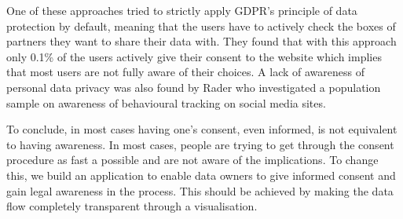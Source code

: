 \documentclass[../paper.tex]{subfiles}
\begin{document}
  One of these approaches tried to strictly apply GDPR's principle of data protection by default, meaning that the users have to actively check the boxes of partners they want to share their data with.
  They found that with this approach only 0.1\% of the users actively give their consent to the website which implies that most users are not fully aware of their choices.  
  A lack of awareness of personal data privacy was also found by Rader \cite{rader2014} who investigated a population sample on awareness of behavioural tracking on social media sites.
  
  To conclude, in most cases having
  one’s consent, even informed, is not equivalent to having awareness.
  In most cases, people are trying to get through the consent procedure as fast a possible and are not aware of the implications.
  To change this, we build an application to enable data owners to give informed
  consent and gain legal awareness in the process. This should be achieved by
  making the data flow completely transparent through a visualisation.


\end{document}
